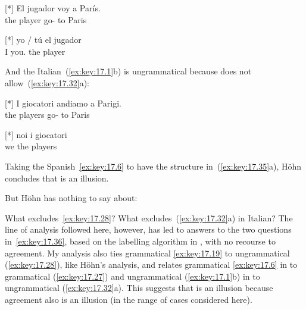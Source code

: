 \documentclass[output=paper]{langsci/langscibook}
\begin{document}
\begin{exe}
\exi{\eqref{ex:key:17.19}}[*]{%
    \gll El jugador voy a París.\\
        the player go-\Fsg{} to Paris\\
    \glt}
\end{exe}

\begin{exe}
\exi{\eqref{ex:key:17.28}}[*]{%
    \gll yo / tú el jugador\\
    I {} you.\Sg{} the player\\
    \glt}
\end{exe}
And the Italian~(\ref{ex:key:17.1}b) is ungrammatical because  does not
allow~(\ref{ex:key:17.32}a):

\begin{exe}
    \exi{\eqref{ex:key:17.1}} 
    \begin{xlist}
    [*]{%
    \gll I giocatori andiamo a Parigi.\\
    the players go-\Fpl{} to Paris\\
    \glt}
    \end{xlist}
\end{exe}

\begin{exe}
\exi{\eqref{ex:key:17.32}}
\begin{xlist}
    [*]{%
    \gll    noi i giocatori\\
            we the players\\
    \glt}
\end{xlist}
\end{exe}
Taking the Spanish~\eqref{ex:key:17.6} to have the structure in~(\ref{ex:key:17.35}a),
Höhn concludes that  is an illusion.

But Höhn has nothing to say about:

\ea\label{ex:key:17.36}
    \ea What excludes~\eqref{ex:key:17.28}?
    \ex What excludes~(\ref{ex:key:17.32}a) in Italian?
    \z
\z
The line of analysis followed here, however, has led to answers to the two
questions in~\eqref{ex:key:17.36}, based on the labelling algorithm in
\citet{Chomsky2013}, with no recourse to agreement. My analysis also ties
grammatical \eqref{ex:key:17.19} to ungrammatical (\ref{ex:key:17.28}), like Höhn’s
analysis, and relates grammatical \eqref{ex:key:17.6} in  to grammatical
(\ref{ex:key:17.27}) and ungrammatical (\ref{ex:key:17.1}b) in  to
ungrammatical (\ref{ex:key:17.32}a). This suggests that  is an
illusion because agreement also is an illusion (in the range of cases
considered here).
\end{document}
